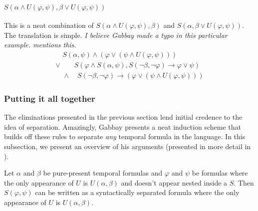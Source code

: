 \documentclass[a4paper,UKenglish,cleveref, autoref, thm-restate]{lipics-v2021}
\begin{document}
\paragraph*{$S(\alpha \land U(\varphi,\psi), \beta \lor U(\varphi, \psi))$}
This is a neat combination of $S(\alpha \land U(\varphi, \psi), \beta)$ and $S(\alpha, \beta \lor U(\varphi, \psi))$. The translation is simple. \textit{I believe Gabbay made a typo in this particular example. \cite{xpathComplete} mentions this.}
\begin{equation*}
    \begin{aligned}
        \quad S(\alpha, \psi) \land (\varphi \lor (\psi \land U(\varphi, \psi))) \\
        \lor \quad \quad S(\varphi \land S(\alpha, \psi), S(\lnot \beta, \lnot \varphi) \to \varphi \lor \psi)\\
        \quad \land \quad S(\lnot \beta, \lnot \varphi) \to (\varphi \lor (\psi \land U(\varphi, \psi)))
    \end{aligned}
\end{equation*}

\subsubsection{Putting it all together}

The eliminations presented in the previous section lend initial credence to the idea of separation. Amazingly, Gabbay presents a neat induction scheme that builds off these rules to separate \textit{any} temporal formula in the language. In this subsection, we present an overview of his arguments (presented in more detail in \cite{gabbay1994}).

\begin{lemma}
\label{lemma:gabbay1}
    Let $\alpha$ and $\beta$ be pure-present temporal formulas and $\varphi$ and $\psi$ be formulas where the only appearance of $U$ is $U(\alpha, \beta)$ and doesn't appear nested inside a $S$. Then $S(\varphi, \psi)$ can be written as a syntactically separated formula where the only appearance of $U$ is $U(\alpha, \beta)$.
\end{lemma}
\end{document}
